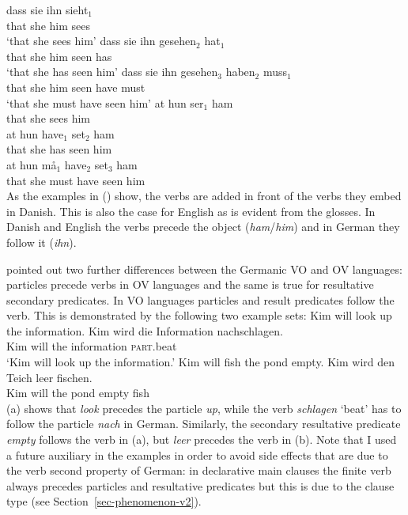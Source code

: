\eal
\ex
\gll dass sie ihn sieht$_1$\\
     that she him sees\\
\glt `that she sees him'
\ex
\gll dass sie ihn gesehen$_2$ hat$_1$\\
     that she him seen        has\\
\glt `that she has seen him'
\ex
\gll dass sie ihn gesehen$_3$ haben$_2$ muss$_1$\\
     that she him seen        have     must\\
\glt `that she must have seen him'
\zl
\eal
\ex
\gll at   hun ser$_1$ ham\\
     that she  sees    him\\
\ex
\gll at   hun have$_1$ set$_2$ ham\\
     that she  has      seen    him\\
\ex
\gll at   hun må$_1$ have$_2$ set$_3$ ham\\
     that she  must   have     seen   him\\
\zl
%
As the examples in () show, the verbs are added in front of the verbs they embed in
Danish. This is also the case for English as is evident from the glosses. In Danish and English the
verbs precede the object (\emph{ham}/\emph{him}) and in German they follow it (\emph{ihn}). 

\citet[Section~15.2]{Haider2020a} pointed out two further differences between the Germanic VO and OV languages:
particles precede verbs in OV languages and the same is true for resultative secondary
predicates. In VO languages particles and result predicates follow the verb. This is demonstrated by
the following two example sets:
\eal
\ex Kim will look up the information.
\ex 
\gll Kim wird die Information nachschlagen.\\
     Kim will the information \textsc{part}.beat\\
\glt `Kim will look up the information.'
\zl
\eal
\ex Kim will fish the pond empty.
\ex 
\gll Kim wird den Teich leer fischen.\\
     Kim will the pond  empty fish\\
\zl
(a) shows that \emph{look} precedes the particle \emph{up}, while the verb \emph{schlagen}
`beat' has to follow the particle \emph{nach} in German. Similarly, the secondary resultative
predicate \emph{empty} follows the verb in (a), but \emph{leer} precedes the verb in
(b). Note that I used a future auxiliary in the examples in order to avoid side effects that
are due to the verb second property of German: in declarative main clauses the finite verb always
precedes particles and resultative predicates but this is due to the clause type (see Section~\ref{sec-phenomenon-v2}).

